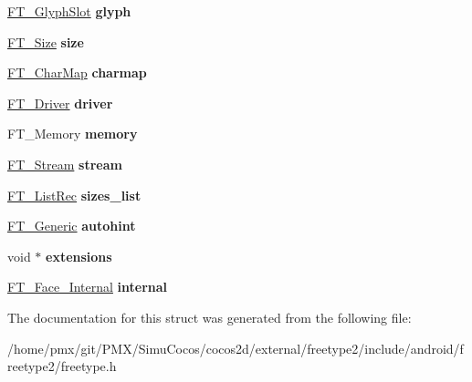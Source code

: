 \begin{DoxyCompactItemize}
\item 
\mbox{\label{structFT__FaceRec___aea701e6584693e684acf300edb28d8f6}} 
\hyperlink{structFT__GlyphSlotRec__}{F\+T\+\_\+\+Glyph\+Slot} {\bfseries glyph}
\item 
\mbox{\label{structFT__FaceRec___a212d116864a5d81e80b176f9b846cd08}} 
\hyperlink{structFT__SizeRec__}{F\+T\+\_\+\+Size} {\bfseries size}
\item 
\mbox{\label{structFT__FaceRec___aca87d50488a5a1489741e8c13414c268}} 
\hyperlink{structFT__CharMapRec__}{F\+T\+\_\+\+Char\+Map} {\bfseries charmap}
\item 
\mbox{\label{structFT__FaceRec___a011b62fcffdd6dc421c9ab3286d4c9fa}} 
\hyperlink{structFT__DriverRec__}{F\+T\+\_\+\+Driver} {\bfseries driver}
\item 
\mbox{\label{structFT__FaceRec___af269b241bfc2f570d485ab03fc0261b2}} 
F\+T\+\_\+\+Memory {\bfseries memory}
\item 
\mbox{\label{structFT__FaceRec___a831d5da25cd0fe2a783d2a73f467de55}} 
\hyperlink{structFT__StreamRec__}{F\+T\+\_\+\+Stream} {\bfseries stream}
\item 
\mbox{\label{structFT__FaceRec___a47504203e02bfba59c802c35cb4009ed}} 
\hyperlink{structFT__ListRec__}{F\+T\+\_\+\+List\+Rec} {\bfseries sizes\+\_\+list}
\item 
\mbox{\label{structFT__FaceRec___a34ba9b1367f1b2d13676043b8da3ea73}} 
\hyperlink{structFT__Generic__}{F\+T\+\_\+\+Generic} {\bfseries autohint}
\item 
\mbox{\label{structFT__FaceRec___aa21fbcafa0c8c7c7c6ac10758f2d4178}} 
void $\ast$ {\bfseries extensions}
\item 
\mbox{\label{structFT__FaceRec___aed9a1267cddcbe790f0591471c886537}} 
\hyperlink{structFT__Face__InternalRec__}{F\+T\+\_\+\+Face\+\_\+\+Internal} {\bfseries internal}
\end{DoxyCompactItemize}


The documentation for this struct was generated from the following file\+:\begin{DoxyCompactItemize}
\item 
/home/pmx/git/\+P\+M\+X/\+Simu\+Cocos/cocos2d/external/freetype2/include/android/freetype2/freetype.\+h\end{DoxyCompactItemize}
